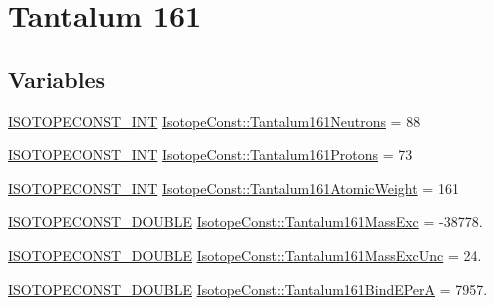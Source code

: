 \hypertarget{group___isotope_const-_tantalum-_ta161}{}\section{Tantalum 161}
\label{group___isotope_const-_tantalum-_ta161}
\subsection*{Variables}
\begin{DoxyCompactItemize}
\item 
\mbox{\hyperlink{group___isotope_const-_macros_ga5f18360b3e99483a35c32d789e62621c}{I\+S\+O\+T\+O\+P\+E\+C\+O\+N\+S\+T\+\_\+\+I\+NT}} \mbox{\hyperlink{group___isotope_const-_tantalum-_ta161_ga6704e59bce5541647031f179af491d73}{Isotope\+Const\+::\+Tantalum161\+Neutrons}} = 88
\item 
\mbox{\hyperlink{group___isotope_const-_macros_ga5f18360b3e99483a35c32d789e62621c}{I\+S\+O\+T\+O\+P\+E\+C\+O\+N\+S\+T\+\_\+\+I\+NT}} \mbox{\hyperlink{group___isotope_const-_tantalum-_ta161_ga19eb6eb9a244d7244683966cb31c083a}{Isotope\+Const\+::\+Tantalum161\+Protons}} = 73
\item 
\mbox{\hyperlink{group___isotope_const-_macros_ga5f18360b3e99483a35c32d789e62621c}{I\+S\+O\+T\+O\+P\+E\+C\+O\+N\+S\+T\+\_\+\+I\+NT}} \mbox{\hyperlink{group___isotope_const-_tantalum-_ta161_ga3b02aef662c68ddd7432dc6cfef7a4c1}{Isotope\+Const\+::\+Tantalum161\+Atomic\+Weight}} = 161
\item 
\mbox{\hyperlink{group___isotope_const-_macros_ga8f45a7272ce02c0b4c65c44636ed719a}{I\+S\+O\+T\+O\+P\+E\+C\+O\+N\+S\+T\+\_\+\+D\+O\+U\+B\+LE}} \mbox{\hyperlink{group___isotope_const-_tantalum-_ta161_ga91d6059c4e56a725cfd658fb35fef6be}{Isotope\+Const\+::\+Tantalum161\+Mass\+Exc}} = -\/38778.
\item 
\mbox{\hyperlink{group___isotope_const-_macros_ga8f45a7272ce02c0b4c65c44636ed719a}{I\+S\+O\+T\+O\+P\+E\+C\+O\+N\+S\+T\+\_\+\+D\+O\+U\+B\+LE}} \mbox{\hyperlink{group___isotope_const-_tantalum-_ta161_ga41347d6a7d4ded7f71e43f6fecb0d5a3}{Isotope\+Const\+::\+Tantalum161\+Mass\+Exc\+Unc}} = 24.
\item 
\mbox{\hyperlink{group___isotope_const-_macros_ga8f45a7272ce02c0b4c65c44636ed719a}{I\+S\+O\+T\+O\+P\+E\+C\+O\+N\+S\+T\+\_\+\+D\+O\+U\+B\+LE}} \mbox{\hyperlink{group___isotope_const-_tantalum-_ta161_ga04cc5b91d7b892b4039b4c9405dcbaac}{Isotope\+Const\+::\+Tantalum161\+Bind\+E\+PerA}} = 7957.
\item 

\end{DoxyCompactItemize}
